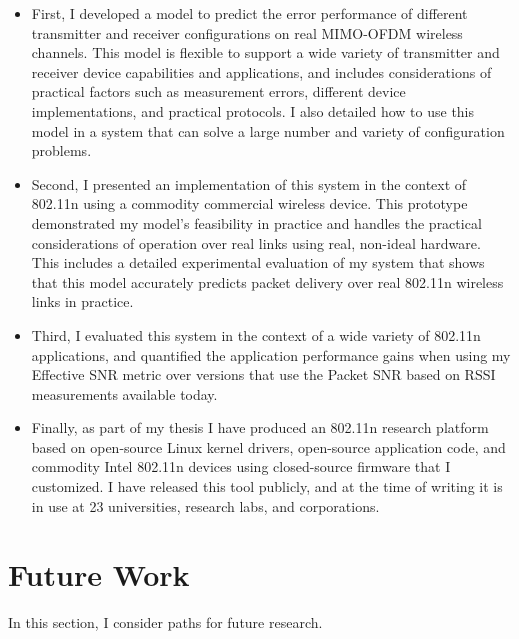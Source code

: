 \begin{itemize}[leftmargin=0.5cm,parsep=1ex,itemsep=1ex,topsep=1ex]
\item First, I developed a model to predict the error performance of different transmitter and receiver configurations on real MIMO-OFDM wireless channels. This model is flexible to support a wide variety of transmitter and receiver device capabilities and applications, and includes considerations of practical factors such as measurement errors, different device implementations, and practical protocols. I also detailed how to use this model in a system that can solve a large number and variety of configuration problems.
\item Second, I presented an implementation of this system in the context of 802.11n using a commodity commercial wireless device. This prototype demonstrated my model's feasibility in practice and handles the practical considerations of operation over real links using real, non-ideal hardware. This includes a detailed experimental evaluation of my system that shows that this model accurately predicts packet delivery over real 802.11n wireless links in practice.
\item Third, I evaluated this system in the context of a wide variety of 802.11n applications, and quantified the application performance gains when using my Effective SNR metric over versions that use the Packet SNR based on RSSI measurements available today.
\item Finally, as part of my thesis I have produced an 802.11n research platform based on open-source Linux kernel drivers, open-source application code, and commodity Intel 802.11n devices using closed-source firmware that I customized.
I have released this tool publicly, and at the time of writing it is in use at 23 universities, research labs, and corporations.
\end{itemize}

\section{Future Work}
In this section, I consider paths for future research.

